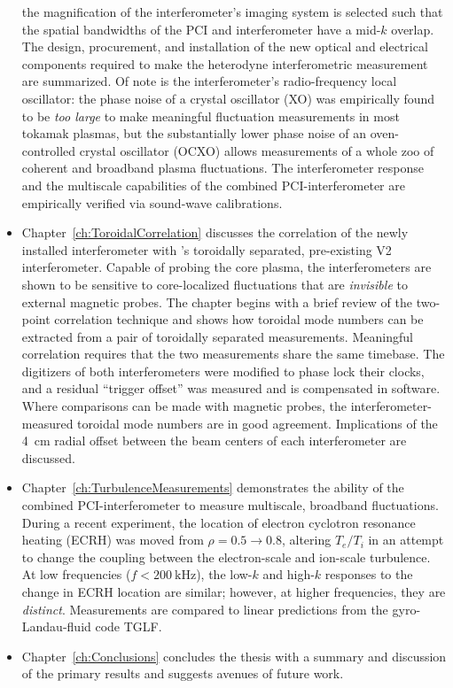 \begin{itemize}
    the magnification of the interferometer's imaging system
    is selected such that the spatial bandwidths
    of the PCI and interferometer have a mid-$k$ overlap.
    The design, procurement, and installation
    of the new optical and electrical components
    required to make the heterodyne interferometric measurement
    are summarized.
    Of note is the interferometer's radio-frequency local oscillator:
    the phase noise of a crystal oscillator (XO)
    was empirically found to be \emph{too large}
    to make meaningful fluctuation measurements in most tokamak plasmas, but
    the substantially lower phase noise of an
    oven-controlled crystal oscillator (OCXO)
    allows measurements of a whole zoo
    of coherent and broadband plasma fluctuations.
    The interferometer response and
    the multiscale capabilities of the combined PCI-interferometer
    are empirically verified via sound-wave calibrations.
  \item Chapter~\ref{ch:ToroidalCorrelation} discusses the correlation
    of the newly installed interferometer with
    \diiid's toroidally separated, pre-existing V2 interferometer.
    Capable of probing the core plasma,
    the interferometers are shown to be sensitive
    to core-localized fluctuations
    that are \emph{invisible} to external magnetic probes.
    The chapter begins with a brief review
    of the two-point correlation technique and
    shows how toroidal mode numbers can be extracted
    from a pair of toroidally separated measurements.
    Meaningful correlation requires that
    the two measurements share the same timebase.
    The digitizers of both interferometers were modified
    to phase lock their clocks, and
    a residual ``trigger offset'' was measured
    and is compensated in software.
    Where comparisons can be made with magnetic probes,
    the interferometer-measured toroidal mode numbers
    are in good agreement.
    Implications of the \SI{4}{\centi\meter} radial offset
    between the beam centers of each interferometer are discussed.
  \item Chapter~\ref{ch:TurbulenceMeasurements} demonstrates
    the ability of the combined PCI-interferometer
    to measure multiscale, broadband fluctuations.
    During a recent \diiid\space experiment,
    the location of electron cyclotron resonance heating (ECRH)
    was moved from $\rho = 0.5 \rightarrow 0.8$,
    altering $T_e / T_i$
    in an attempt to change the coupling between
    the electron-scale and ion-scale turbulence.
    At low frequencies ($f < \SI{200}{\kilo\hertz}$),
    the low-$k$ and high-$k$ responses to the change in ECRH location
    are similar;
    however, at higher frequencies, they are \emph{distinct}.
    Measurements are compared to linear predictions
    from the gyro-Landau-fluid code TGLF.
  \item Chapter~\ref{ch:Conclusions} concludes the thesis
    with a summary and discussion of the primary results
    and suggests avenues of future work.
\end{itemize}


